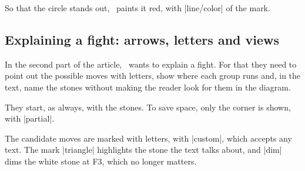 \begin{goban}
So that the circle stands out, \karu\ paints it red, with |line/color| of the mark.

\begin{codeexample}[]
	\begin{goban}[partial = B2:E4, background = {line = false}]
	\end{goban}
\end{codeexample}

\subsection{Explaining a fight: arrows, letters and views}
\label{tut:pelea}

In the second part of the article, \karu\ wants to explain a fight. For that they need to point out the possible moves with letters, show where each group runs and, in the text, name the stones without making the reader look for them in the diagram.

\begin{figure}[H]
	\centering
	\begin{goban}[partial = A1:G7, label = {at = {north, west}}]
	\end{goban}
\end{figure}

They start, as always, with the stones. To save space, only the corner is shown, with |partial|.

\begin{codeexample}[width=4.8cm]
	\begin{goban}[partial = A1:G7, label = {at = {north, west}}]
	\end{goban}
\end{codeexample}

The candidate moves are marked with letters, with |custom|, which accepts any text. The mark |triangle| highlights the stone the text talks about, and |dim| dims the white stone at F3, which no longer matters.

\begin{codeexample}[width=4.8cm]
	\begin{goban}[partial = A1:G7, label = {at = {north, west}}]
	\end{goban}
\end{codeexample}


\end{goban}
